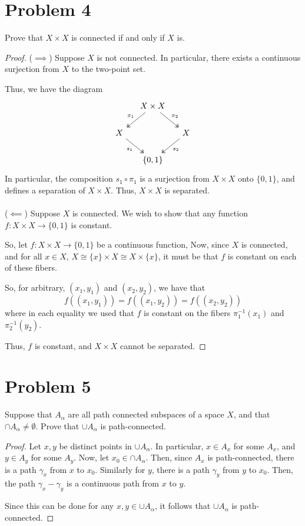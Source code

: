 \documentclass[fontsize=11pt]{scrartcl} %
\numberwithin{equation}{section} %
\numberwithin{figure}{section} %
\numberwithin{table}{section} %
\begin{document}
\section*{Problem 4}
Prove that $X\times X$ is connected if and only if $X$ is.
\\
\begin{proof}
    ($\implies$)
    Suppose $X$ is not connected. In particular, there exists a continuous
    surjection from $X$ to the two-point set.

    Thus, we have the diagram
    \[
        \begin{tikzcd}[column sep=small]
            &X\times X
            \arrow[two heads]{dl}[swap]{\pi_1}
            \arrow[two heads]{dr}{\pi_2}
            &\\
            X
            \arrow[two heads]{dr}[swap]{s_1} 
            &&
            X
            \arrow[two heads]{dl}{s_2}\\
            &\{0,1\}&
        \end{tikzcd}
    \]
    In particular, the composition $s_1\circ\pi_1$ is a surjection from
    $X\times X$ onto $\{0,1\}$, and defines a separation of $X\times
    X$. Thus, $X\times X$ is separated.
    \\
    \\
    ($\impliedby$)
    Suppose $X$ is connected. We wish to show that any function $f:X\times
    X\to\{0,1\}$ is constant.

    So, let $f:X\times X\to \{0,1\}$ be a continuous function,
    Now, since $X$ is connected, and for all $x\in X$, $X\cong \{x\}\times X 
    \cong X\times \{x\}$, it must be that $f$ is constant on each of these
    fibers.

    So, for arbitrary, $(x_1,y_1)$ and $(x_2,y_2)$, we have that
    \[
        f((x_1,y_1)) = f((x_1,y_2)) = f((x_2,y_2))
    \]
    where in each equality we used that $f$ is constant on the fibers
    $\pi_1^{-1}(x_1)$ and $\pi_2^{-1}(y_2)$.

    Thus, $f$ is constant, and $X\times X$ cannot be separated.
\end{proof}

\newpage

\section*{Problem 5}
Suppose that $A_{\alpha}$ are all path connected subspaces of a space $X$, and
that $\cap A_{\alpha}\neq \emptyset$. Prove that $\cup A_{\alpha}$ is
path-connected.
\\
\begin{proof}
    Let $x,y$ be distinct points in $\cup A_{\alpha}$. In particular, $x\in A_x$
    for some $A_x$, and $y\in A_y$ for some $A_y$. Now, let $x_0\in \cap
    A_{\alpha}$. Then, since $A_x$ is path-connected, there is a path $\gamma_x$
    from $x$ to $x_0$. Similarly for $y$, there is a path $\gamma_y$ from $y$ to
    $x_0$. Then, the path $\gamma_x - \gamma_y$ is a continuous path from $x$ to
    $y$. 

    Since this can be done for any $x,y\in \cup A_{\alpha}$, it follows that
    $\cup A_{\alpha}$ is path-connected.
\end{proof}
\end{document}
